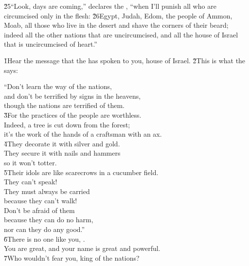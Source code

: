 \v{25}``Look, days are coming,'' declares the , ``when I'll punish all who are circumcised only in the flesh: \v{26}Egypt, Judah, Edom, the people of Ammon, Moab, all those who live in the desert and shave the corners of their beard; indeed all the other nations that are uncircumcised, and all the house of Israel that is uncircumcised of heart.''

\v{1}Hear the message that the  has spoken to you, house of Israel. \v{2}This is what the  says:

\begin{poetry}
\poeml ``Don't learn the way of the nations, \\
\poemll    and don't be terrified by signs in the heavens, \\
\poemll    though the nations are terrified of them. \\
\poeml \v{3}For the practices of the people are worthless. \\
\poemll    Indeed, a tree is cut down from the forest; \\
\poemlll       it's the work of the hands of a craftsman with an ax. \\
\poeml \v{4}They decorate it with silver and gold. \\
\poemll    They secure it with nails and hammers \\
\poemlll       so it won't totter. \\
\poeml \v{5}Their idols are like scarecrows in a cucumber field. \\
\poemll    They can't speak! \\
\poeml They must always be carried \\
\poemll    because they can't walk! \\
\poeml Don't be afraid of them \\
\poemll    because they can do no harm, \\
\poemlll       nor can they do any good.'' \\
\poeml \v{6}There is no one like you, . \\
\poemll    You are great, and your name is great and powerful. \\
\poeml \v{7}Who wouldn't fear you, king of the nations? \\

\end{poetry}
